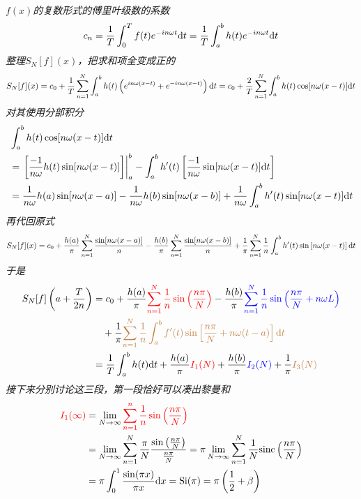 \documentclass[UTF8]{ctexart}
\newcommand{\trm}[1]{{\rm #1}}
\begin{document}
\textit{
    \(f(x)\)的复数形式的傅里叶级数的系数
    \[c_n = \frac{1}{T} \int_{0}^{T} f(t)e^{-in\omega t}\trm{d}t = \frac{1}{T} \int_{a}^{b}h(t)e^{-in\omega t}\trm{d}t\]
    整理\(S_N[f](x)\)，把求和项全变成正的
    \[S_N[f](x) = c_0+\frac{1}{T}\sum_{n=1}^{N}\int_{a}^{b}h(t)\left(e^{in\omega(x-t)}+e^{-in\omega(x-t)}\right)\trm{d}t = c_0+\frac{2}{T}\sum_{n=1}^{N}\int_{a}^{b} h(t)\cos[n\omega(x-t)]\trm{d}t\]
    对其使用分部积分
    \begin{align*}
        & \int_{a}^{b}h(t)\cos[n\omega(x-t)]\trm{d}t \\
        &= \left.\left[\frac{-1}{n\omega}h(t)\sin[n\omega(x-t)]\right]\right|_{a}^{b}-\int_{a}^{b} h'(t)\left[\frac{-1}{n\omega}\sin[n\omega(x-t)]\trm{d}t\right] \\
        &= \frac{1}{n\omega}h(a)\sin[n\omega(x-a)] - \frac{1}{n\omega}h(b)\sin[n\omega(x-b)] + \frac{1}{n\omega}\int_{a}^{b}h'(t)\sin[n\omega(x-t)]\trm{d}t
    \end{align*}
    再代回原式
    \[S_N[f](x) = c_0+\frac{h(a)}{\pi}\sum_{n=1}^{N}\frac{\sin[n\omega(x-a)]}{n} - \frac{h(b)}{\pi}\sum_{n=1}^{N}\frac{\sin[n\omega(x-b)]}{n} + \frac{1}{\pi}\sum_{n=1}^{N}\frac{1}{n}\int_{a}^{b}h'(t)\sin\left[n\omega(x-t)\right]\trm{d}t\]
    于是
    \begin{align*}
        S_N[f]\left(a+\frac{T}{2n}\right) &= c_0 +\frac{h(a)}{\pi}{\color{red}\sum_{n=1}^{N}\frac{1}{n}\sin\left(\frac{n\pi}{N}\right)} 
        -\frac{h(b)}{\pi}{\color{blue}\sum_{n=1}^{N}\frac{1}{n}\sin\left(\frac{n\pi}{N}+n\omega L\right)} \\
        & \quad +\frac{1}{\pi}{\color{brown}\sum_{n=1}^{N}\frac{1}{n}\int_{a}^  {b}f'(t)\sin\left[\frac{n\pi}{N}+n\omega(t-a)\right]\trm{d}t} \\
        &= \frac{1}{T}\int_{a}^{b}h(t)\trm{d}t + \frac{h(a)}{\pi}{\color{red}I_1(N)}+ \frac{h(b)}{\pi}{\color{blue}I_2(N)} + \frac{1}{\pi}{\color{brown}I_3(N)}
    \end{align*}
    接下来分别讨论这三段，第一段恰好可以凑出黎曼和
    \begin{align*}
        {\color{red}I_1(\infty)} & = \lim_{N \to \infty}{\color{red}\sum_{n=1}^{n}\frac{1}{n}\sin\left(\frac{n\pi}{N}\right)} \\
        &=  \lim_{N \to \infty} \sum_{n=1}^{N}\frac{\pi}{N}\frac{\sin\left(\frac{n\pi}{N}\right)}{\frac{n\pi}{N}}  = \pi \lim_{N\to\infty} \sum_{n=1}^{N}\frac{1}{N}\trm{sinc}\left(\frac{n\pi}{N}\right)\\
        &= \pi\int_{0}^{1}\frac{\sin(\pi x)}{\pi x}\trm{d}x = \trm{Si}(\pi) = \pi\left(\frac{1}{2}+\beta\right)

\end{align*}}
\end{document}
